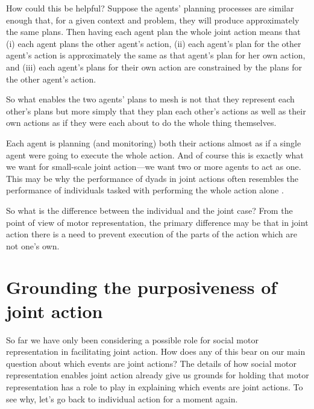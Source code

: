 \documentclass[12pt,\papersize]{extarticle}
\begin{document}
How could this be helpful?
Suppose the agents' planning processes are similar enough that, for a given context and problem, they will produce approximately the same plans.
Then having each agent plan the whole joint action means that (i) each agent plans the other agent's action,
(ii) each agent's plan for the other agent's action is approximately the same as that agent's plan for her own action,
and 
(iii) each  agent's plans for their own action are constrained by the plans for the other agent's action.

So what enables the two agents' plans to mesh is not that they represent each other's plans but more simply that they plan each other's actions as well as their own actions as if they were each about to do the whole thing themselves.

Each agent is planning (and monitoring) both their actions almost as if a single agent were going to execute the whole action.
And of course this is exactly what we want for small-scale joint action---we want two or more agents to act as one.
This may be why the performance of dyads in joint actions often resembles the performance of individuals tasked with performing the whole action alone \citep{Knoblich:2003nf}.

So what is the difference between the individual and the joint case?  From the point of view of motor representation, the primary difference may be that in joint action there is a need to prevent execution of the parts of the action which are not one’s own.



\section{Grounding the purposiveness of joint action}
So far we have only been considering a possible role for social motor representation in facilitating joint action.  
How does any of this bear on our main question about which events are joint actions?
The details of how 
social motor representation enables joint action
 already give us grounds for holding that motor representation has a role to play in explaining which events are joint actions.
To see why,
let’s go back to individual action for a moment again.
\end{document}
